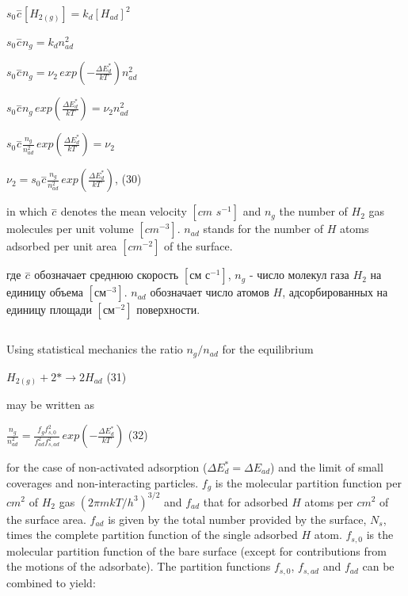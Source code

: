 \documentclass[11pt]{article}
\makeatletter
\newcommand{\boxspacing}{\kern\kvtcb@left@rule\kern\kvtcb@boxsep}
\newcommand{\prompt}[4]{
        {\ttfamily\llap{{\color{#2}[#3]:\hspace{3pt}#4}}\vspace{-\baselineskip}}
    }
\makeatother
\begin{document}
    \(s_0\overset{-}c\left[ H_{2(g)} \right] = k_d \left[ H_{ad} \right]^2\)

    \(s_0\overset{-}c n_g = k_d n_{ad}^2\)

    \(s_0\overset{-}c n_g = \nu_2 \, exp \left(-\frac{\Delta E^{*}_{d}}{kT} \right) n_{ad}^2\)

    \(s_0\overset{-}c n_g \, exp \left(\frac{\Delta E^{*}_{d}}{kT} \right) = \nu_2 n_{ad}^2\)

    \(s_0\overset{-}c \frac{n_g}{n_{ad}^2} \, exp \left(\frac{\Delta E^{*}_{d}}{kT} \right) = \nu_2\)

    \(\nu_2 = s_0\overset{-}c \frac{n_g}{n_{ad}^2} \, exp \left(\frac{\Delta E^{*}_{d}}{kT} \right)\),
(30)

    in which \(\overset{-}c\) denotes the mean velocity \([cm \,\,s^{-1}]\)
and \(n_g\) the number of \(H_2\) gas molecules per unit volume
\([cm^{-3}]\). \(n_{ad}\) stands for the number of \(H\) atoms adsorbed
per unit area \([cm^{-2}]\) of the surface.

    где \(\overset{-}c\) обозначает среднюю скорость \([см\,\,с^{-1}]\),
\(n_g\) - число молекул газа \(H_2\) на единицу объема \([см^{-3}]\).
\(n_{ad}\) обозначает число атомов \(H\), адсорбированных на единицу
площади \([см^{-2}]\) поверхности.

    \begin{tcolorbox}[breakable, size=fbox, boxrule=1pt, pad at break*=1mm,colback=cellbackground, colframe=cellborder]
\prompt{In}{incolor}{ }{\boxspacing}
\begin{Verbatim}[commandchars=\\\{\}]

\end{Verbatim}
\end{tcolorbox}

    Using statistical mechanics the ratio \(n_g/n_{ad}\) for the equilibrium

\(H_{2(g)} + 2 * {\rightarrow} 2 H_{ad}\) (31)

may be written as

\(\frac{n_g}{n_{ad}^2} = \frac{f_g f_{s,0}^2}{f_{ad}^2 f_{s,ad}^2} \, exp \left(-\frac{\Delta E^{*}_{d}}{kT} \right)\)
(32)

for the case of non-activated adsorption
(\(\Delta E^{*}_{d} = \Delta E_{ad}\)) and the limit of small coverages
and non-interacting particles. \(f_g\) is the molecular partition
function per \(cm^2\) of \(H_2\) gas \((2 \pi m k T/h^3)^{3/2}\) and
\(f_{ad}\) that for adsorbed \(H\) atoms per \(cm^2\) of the surface
area. \(f_{ad}\) is given by the total number provided by the surface,
\(N_s\), times the complete partition function of the single adsorbed
\(H\) atom. \(f_{s,0}\) is the molecular partition function of the bare
surface (except for contributions from the motions of the adsorbate).
The partition functions \(f_{s,0}\), \(f_{s,ad}\) and \(f_{ad}\) can be
combined to yield:
\end{document}

